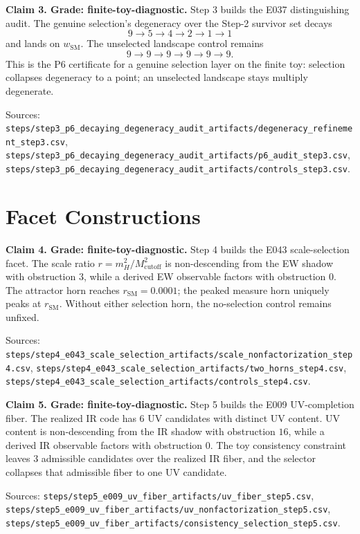 \documentclass[11pt]{article}
\begin{document}
\textbf{Claim 3. Grade: finite-toy-diagnostic.}
Step 3 builds the E037 distinguishing audit. The genuine selection's degeneracy over the Step-2 survivor set decays
\[
9\to5\to4\to2\to1\to1
\]
and lands on \(w_{\mathrm{SM}}\). The unselected landscape control remains
\[
9\to9\to9\to9\to9\to9.
\]
This is the P6 certificate for a genuine selection layer on the finite toy: selection collapses degeneracy to a point; an unselected landscape stays multiply degenerate.

Sources: \texttt{steps/step3\_p6\_decaying\_degeneracy\_audit\_artifacts/degeneracy\_refinement\_step3.csv}, \texttt{steps/step3\_p6\_decaying\_degeneracy\_audit\_artifacts/p6\_audit\_step3.csv}, \texttt{steps/step3\_p6\_decaying\_degeneracy\_audit\_artifacts/controls\_step3.csv}.

\section{Facet Constructions}

\textbf{Claim 4. Grade: finite-toy-diagnostic.}
Step 4 builds the E043 scale-selection facet. The scale ratio \(r=m_H^2/M_{\mathrm{cutoff}}^2\) is non-descending from the EW shadow with obstruction \(3\), while a derived EW observable factors with obstruction \(0\). The attractor horn reaches \(r_{\mathrm{SM}}=0.0001\); the peaked measure horn uniquely peaks at \(r_{\mathrm{SM}}\). Without either selection horn, the no-selection control remains unfixed.

Sources: \texttt{steps/step4\_e043\_scale\_selection\_artifacts/scale\_nonfactorization\_step4.csv}, \texttt{steps/step4\_e043\_scale\_selection\_artifacts/two\_horns\_step4.csv}, \texttt{steps/step4\_e043\_scale\_selection\_artifacts/controls\_step4.csv}.

\textbf{Claim 5. Grade: finite-toy-diagnostic.}
Step 5 builds the E009 UV-completion fiber. The realized IR code has \(6\) UV candidates with distinct UV content. UV content is non-descending from the IR shadow with obstruction \(16\), while a derived IR observable factors with obstruction \(0\). The toy consistency constraint leaves \(3\) admissible candidates over the realized IR fiber, and the selector collapses that admissible fiber to one UV candidate.

Sources: \texttt{steps/step5\_e009\_uv\_fiber\_artifacts/uv\_fiber\_step5.csv}, \texttt{steps/step5\_e009\_uv\_fiber\_artifacts/uv\_nonfactorization\_step5.csv}, \texttt{steps/step5\_e009\_uv\_fiber\_artifacts/consistency\_selection\_step5.csv}.
\end{document}
